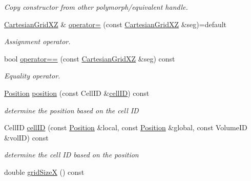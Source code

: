 \begin{DoxyCompactItemize}
\begin{DoxyCompactList}\small\item\em Copy constructor from other polymorph/equivalent handle. \end{DoxyCompactList}\item 
\hyperlink{class_d_d4hep_1_1_geometry_1_1_cartesian_grid_x_z}{Cartesian\+Grid\+XZ} \& \hyperlink{class_d_d4hep_1_1_geometry_1_1_cartesian_grid_x_z_a3d8a9bd431f6f7f9e4918c07fb43d606}{operator=} (const \hyperlink{class_d_d4hep_1_1_geometry_1_1_cartesian_grid_x_z}{Cartesian\+Grid\+XZ} \&seg)=default
\begin{DoxyCompactList}\small\item\em Assignment operator. \end{DoxyCompactList}\item 
bool \hyperlink{class_d_d4hep_1_1_geometry_1_1_cartesian_grid_x_z_ab1d668dd19cd3c4f608b79fb945b3e55}{operator==} (const \hyperlink{class_d_d4hep_1_1_geometry_1_1_cartesian_grid_x_z}{Cartesian\+Grid\+XZ} \&seg) const
\begin{DoxyCompactList}\small\item\em Equality operator. \end{DoxyCompactList}\item 
\hyperlink{namespace_d_d4hep_1_1_geometry_a55083902099d03506c6db01b80404900}{Position} \hyperlink{class_d_d4hep_1_1_geometry_1_1_cartesian_grid_x_z_a5a5fcdf64dbdb7ad2adc042f7e07158c}{position} (const Cell\+ID \&\hyperlink{class_d_d4hep_1_1_geometry_1_1_cartesian_grid_x_z_a6b70239098d046763a1ada29146ab1be}{cell\+ID}) const
\begin{DoxyCompactList}\small\item\em determine the position based on the cell ID \end{DoxyCompactList}\item 
Cell\+ID \hyperlink{class_d_d4hep_1_1_geometry_1_1_cartesian_grid_x_z_a6b70239098d046763a1ada29146ab1be}{cell\+ID} (const \hyperlink{namespace_d_d4hep_1_1_geometry_a55083902099d03506c6db01b80404900}{Position} \&local, const \hyperlink{namespace_d_d4hep_1_1_geometry_a55083902099d03506c6db01b80404900}{Position} \&global, const Volume\+ID \&vol\+ID) const
\begin{DoxyCompactList}\small\item\em determine the cell ID based on the position \end{DoxyCompactList}\item 
double \hyperlink{class_d_d4hep_1_1_geometry_1_1_cartesian_grid_x_z_a61d98a06d62e5456eae54727cae54e0b}{grid\+SizeX} () const

\end{DoxyCompactItemize}
